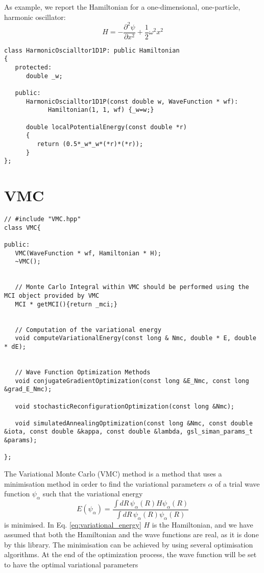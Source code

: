 \documentclass[11pt,a4paper,twoside]{article}
\begin{document}
As example, we report the Hamiltonian for a one-dimensional, one-particle, harmonic oscillator:
\begin{equation}
  H = - \frac{\partial^2 \psi}{\partial x^2} + \frac{1}{2} \omega^2 x^2
\end{equation}

\begin{lstlisting}
class HarmonicOscialltor1D1P: public Hamiltonian
{
   protected:
      double _w;

   public:
      HarmonicOscialltor1D1P(const double w, WaveFunction * wf):
            Hamiltonian(1, 1, wf) {_w=w;}

      double localPotentialEnergy(const double *r)
      {
         return (0.5*_w*_w*(*r)*(*r));
      }
};
\end{lstlisting}




\section{VMC} %
\label{sec:vmc}

\begin{lstlisting}
// #include "VMC.hpp"
class VMC{

public:
   VMC(WaveFunction * wf, Hamiltonian * H);
   ~VMC();


   // Monte Carlo Integral within VMC should be performed using the MCI object provided by VMC
   MCI * getMCI(){return _mci;}


   // Computation of the variational energy
   void computeVariationalEnergy(const long & Nmc, double * E, double * dE);


   // Wave Function Optimization Methods
   void conjugateGradientOptimization(const long &E_Nmc, const long &grad_E_Nmc);

   void stochasticReconfigurationOptimization(const long &Nmc);

   void simulatedAnnealingOptimization(const long &Nmc, const double &iota, const double &kappa, const double &lambda, gsl_siman_params_t &params);

};
\end{lstlisting}

The Variational Monte Carlo (VMC) method is a method that uses a minimisation method in order to find the variational parameters $\alpha$ of a trial wave function $\psi_{\alpha}$ such that the variational energy
\begin{equation}
  E(\psi_{\alpha}) = \frac{\int dR \, \psi_{\alpha}(R) H \psi_{\alpha}(R)}{\int dR \, \psi_{\alpha}(R) \psi_{\alpha}(R)}  \label{eq:variational_energy}
\end{equation}
is minimised.
In Eq. \eqref{eq:variational_energy} $H$ is the Hamiltonian, and we have assumed that both the Hamiltonian and the wave functions are real, as it is done by this library.
The minimisation can be achieved by using several optimisation algorithms. At the end of the optimization process, the wave function will be set to have the optimal variational parameters
\end{document}
